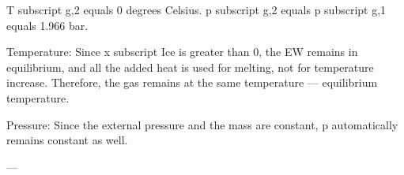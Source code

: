T subscript g,2 equals 0 degrees Celsius.  
p subscript g,2 equals p subscript g,1 equals 1.966 bar.  

Temperature:  
Since x subscript Ice is greater than 0, the EW remains in equilibrium, and all the added heat is used for melting, not for temperature increase. Therefore, the gas remains at the same temperature — equilibrium temperature.  

Pressure:  
Since the external pressure and the mass are constant, p automatically remains constant as well.  

---